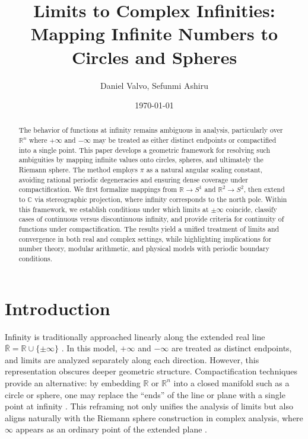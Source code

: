 \documentclass[12pt]{article}
\theoremstyle{remark}
\begin{document}
\title{Limits to Complex Infinities:\\ Mapping Infinite Numbers to Circles and Spheres}
\author{Daniel Valvo, Sefunmi Ashiru}
\date{\today}

\maketitle

\begin{abstract}
    The behavior of functions at infinity remains ambiguous in analysis, particularly over $\mathbb{R}^n$ where $+\infty$ and $-\infty$ may be treated as either distinct endpoints or compactified into a single point. This paper develops a geometric framework for resolving such ambiguities by mapping infinite values onto circles, spheres, and ultimately the Riemann sphere. The method employs $\pi$ as a natural angular scaling constant, avoiding rational periodic degeneracies and ensuring dense coverage under compactification. We first formalize mappings from $\mathbb{R} \to S^1$ and $\mathbb{R}^2 \to S^2$, then extend to $\mathbb{C}$ via stereographic projection, where infinity corresponds to the north pole. Within this framework, we establish conditions under which limits at $\pm\infty$ coincide, classify cases of continuous versus discontinuous infinity, and provide criteria for continuity of functions under compactification. The results yield a unified treatment of limits and convergence in both real and complex settings, while highlighting implications for number theory, modular arithmetic, and physical models with periodic boundary conditions.
\end{abstract}

\tableofcontents

\section{Introduction}
Infinity is traditionally approached linearly along the extended real line 
$\overline{\mathbb{R}} = \mathbb{R} \cup \{\pm \infty\}$ \citep{MunkresTopology,WillardGT}. 
In this model, $+\infty$ and $-\infty$ are treated as distinct endpoints, and limits are analyzed separately along 
each direction. However, this representation obscures deeper geometric structure. 
Compactification techniques provide an alternative: by embedding $\mathbb{R}$ or 
$\mathbb{R}^n$ into a closed manifold such as a circle or sphere, one may replace 
the “ends” of the line or plane with a single point at infinity \citep{MunkresTopology}. 
This reframing not only unifies the analysis of limits but also aligns naturally with the 
Riemann sphere construction in complex analysis, where $\infty$ appears as an 
ordinary point of the extended plane \citep{AhlforsComplex}.  
\end{document}
